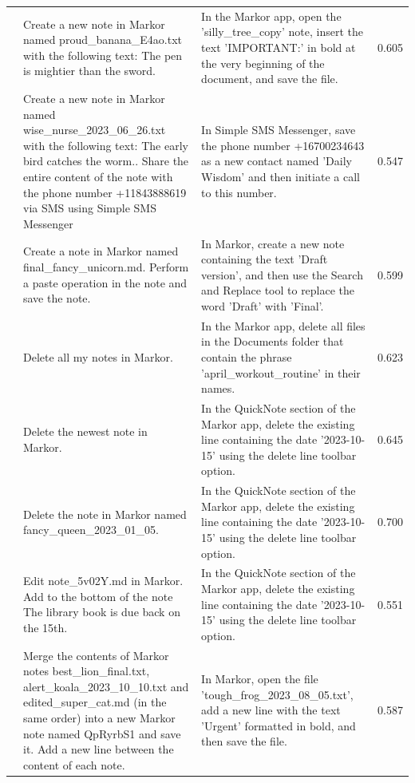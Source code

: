 \documentclass{article} %
\begin{document}
\begin{scriptsize}
\begin{longtable}{@{} c >{\raggedright\arraybackslash}p{} >{\raggedright\arraybackslash}p{} c @{}}
\addlinespace[2pt]
27 & Create a new note in Markor named proud\_banana\_E4ao.txt with the following text: The pen is mightier than the sword. & In the Markor app, open the 'silly\_tree\_copy' note, insert the text 'IMPORTANT:' in bold at the very beginning of the document, and save the file. & 0.605 \\
\addlinespace[2pt]
28 & Create a new note in Markor named wise\_nurse\_2023\_06\_26.txt with the following text: The early bird catches the worm.. Share the entire content of the note with the phone number +11843888619 via SMS using Simple SMS Messenger & In Simple SMS Messenger, save the phone number +16700234643 as a new contact named 'Daily Wisdom' and then initiate a call to this number. & 0.547 \\
\addlinespace[2pt]
29 & Create a note in Markor named final\_fancy\_unicorn.md. Perform a paste operation in the note and save the note. & In Markor, create a new note containing the text 'Draft version', and then use the Search and Replace tool to replace the word 'Draft' with 'Final'. & 0.599 \\
\addlinespace[2pt]
30 & Delete all my notes in Markor. & In the Markor app, delete all files in the Documents folder that contain the phrase 'april\_workout\_routine' in their names. & 0.623 \\
\addlinespace[2pt]
31 & Delete the newest note in Markor. & In the QuickNote section of the Markor app, delete the existing line containing the date '2023-10-15' using the delete line toolbar option. & 0.645 \\
\addlinespace[2pt]
32 & Delete the note in Markor named fancy\_queen\_2023\_01\_05. & In the QuickNote section of the Markor app, delete the existing line containing the date '2023-10-15' using the delete line toolbar option. & 0.700 \\
\addlinespace[2pt]
33 & Edit note\_5v02Y.md in Markor. Add to the bottom of the note The library book is due back on the 15th. & In the QuickNote section of the Markor app, delete the existing line containing the date '2023-10-15' using the delete line toolbar option. & 0.551 \\
\addlinespace[2pt]
34 & Merge the contents of Markor notes best\_lion\_final.txt, alert\_koala\_2023\_10\_10.txt and edited\_super\_cat.md (in the same order) into a new Markor note named QpRyrbS1 and save it. Add a new line between the content of each note. & In Markor, open the file 'tough\_frog\_2023\_08\_05.txt', add a new line with the text 'Urgent' formatted in bold, and then save the file. & 0.587 \\

\end{longtable}
\end{scriptsize}
\end{document}
